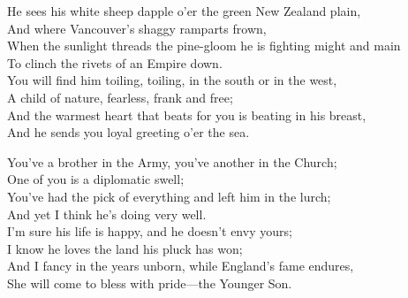 \begin{poemblock}
He sees his white sheep dapple o'er the green New Zealand plain,\\
\idt And where Vancouver's shaggy ramparts frown,\\
When the sunlight threads the pine-gloom he is fighting might and main\\
\idt To clinch the rivets of an Empire down.\\
You will find him toiling, toiling, in the south or in the west,\\
\idt A child of nature, fearless, frank and free;\\
And the warmest heart that beats for you is beating in his breast,\\
\idt And he sends you loyal greeting o'er the sea.

You've a brother in the Army, you've another in the Church;\\
\idt One of you is a diplomatic swell;\\
You've had the pick of everything and left him in the lurch;\\
\idt And yet I think he's doing very well.\\
I'm sure his life is happy, and he doesn't envy yours;\\
\idt I know he loves the land his pluck has won;\\
And I fancy in the years unborn, while England's fame endures,\\
\idt She will come to bless with pride—the Younger Son.

\end{poemblock}
